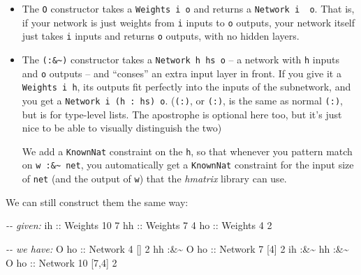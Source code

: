 \documentclass[]{article}
\newenvironment{Shaded}{}{}
\newcommand{\CommentTok}[1]{\textcolor[rgb]{0.38,0.63,0.69}{\textit{#1}}}
\newcommand{\DataTypeTok}[1]{\textcolor[rgb]{0.56,0.13,0.00}{#1}}
\newcommand{\DecValTok}[1]{\textcolor[rgb]{0.25,0.63,0.44}{#1}}
\newcommand{\NormalTok}[1]{#1}
\newcommand{\OperatorTok}[1]{\textcolor[rgb]{0.40,0.40,0.40}{#1}}
\newcommand{\OtherTok}[1]{\textcolor[rgb]{0.00,0.44,0.13}{#1}}
\begin{document}
\begin{itemize}
\item
  The \texttt{O} constructor takes a \texttt{Weights\ i\ o} and returns a
  \texttt{Network\ i\ \textquotesingle{}{[}{]}\ o}. That is, if your network is
  just weights from \texttt{i} inputs to \texttt{o} outputs, your network itself
  just takes \texttt{i} inputs and returns \texttt{o} outputs, with no hidden
  layers.
\item
  The \texttt{(:\&\textasciitilde{})} constructor takes a
  \texttt{Network\ h\ hs\ o} -- a network with \texttt{h} inputs and \texttt{o}
  outputs -- and ``conses'' an extra input layer in front. If you give it a
  \texttt{Weights\ i\ h}, its outputs fit perfectly into the inputs of the
  subnetwork, and you get a
  \texttt{Network\ i\ (h\ \textquotesingle{}:\ hs)\ o}.
  (\texttt{(\textquotesingle{}:)}, or \texttt{(:)}, is the same as normal
  \texttt{(:)}, but is for type-level lists. The apostrophe is optional here
  too, but it's just nice to be able to visually distinguish the two)

  We add a \texttt{KnownNat} constraint on the \texttt{h}, so that whenever you
  pattern match on \texttt{w\ :\&\textasciitilde{}\ net}, you automatically get
  a \texttt{KnownNat} constraint for the input size of \texttt{net} (and the
  output of \texttt{w}) that the \emph{hmatrix} library can use.
\end{itemize}

We can still construct them the same way:

\begin{Shaded}
\begin{Highlighting}[]
\CommentTok{{-}{-} given:}
\OtherTok{ih ::} \DataTypeTok{Weights} \DecValTok{10} \DecValTok{7}
\OtherTok{hh ::} \DataTypeTok{Weights}  \DecValTok{7} \DecValTok{4}
\OtherTok{ho ::} \DataTypeTok{Weights}  \DecValTok{4} \DecValTok{2}

\CommentTok{{-}{-} we have:}
              \DataTypeTok{O}\OtherTok{ ho ::} \DataTypeTok{Network}  \DecValTok{4}\NormalTok{ \textquotesingle{}[] }\DecValTok{2}
\NormalTok{       hh }\OperatorTok{:\&\textasciitilde{}} \DataTypeTok{O}\OtherTok{ ho ::} \DataTypeTok{Network}  \DecValTok{7}\NormalTok{ \textquotesingle{}[}\DecValTok{4}\NormalTok{] }\DecValTok{2}
\NormalTok{ih }\OperatorTok{:\&\textasciitilde{}}\NormalTok{ hh }\OperatorTok{:\&\textasciitilde{}} \DataTypeTok{O}\OtherTok{ ho ::} \DataTypeTok{Network} \DecValTok{10}\NormalTok{ \textquotesingle{}[}\DecValTok{7}\NormalTok{,}\DecValTok{4}\NormalTok{] }\DecValTok{2}
\end{Highlighting}
\end{Shaded}
\end{document}
